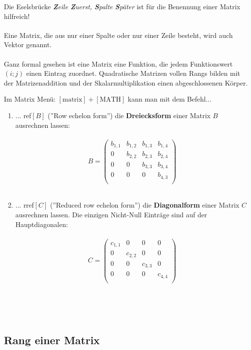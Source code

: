 \documentclass[main.tex]{subfiles}
\begin{document}
\begin{Bemerkung}
Die Eselsbrücke \textit{\textbf{Z}eile \textbf{Z}uerst, \textbf{S}palte \textbf{S}päter} ist für die Benennung einer Matrix hilfreich!\\\\
Eine Matrix, die aus nur einer Spalte oder nur einer Zeile besteht, wird auch Vektor genannt.\\\\
Ganz formal gesehen ist eine Matrix eine Funktion, die jedem Funktionswert $(i;j)$ einen Eintrag zuordnet. Quadratische Matrizen vollen Rangs bilden mit der Matrizenaddition und der Skalarmultiplikation einen abgeschlossenen Körper.
\end{Bemerkung}


\begin{GTR-Tipp}
Im Matrix Menü: $[\text{matrix}] + [\text{MATH}]$ kann man mit dem Befehl...\\
\begin{enumerate}
\item ... ref$[B]$ (''Row echelon form'') die \textbf{Dreiecksform} einer Matrix $B$ ausrechnen lassen:\\\\
$$B= \begin{pmatrix}
b_{1,1}&b_{1,2}&b_{1,3}&b_{1,4}\\
0&b_{2,2}&b_{2,3}&b_{2,4}\\
0&0&b_{3,3}&b_{3,4}\\
0&0&0&b_{4,3}\\
\end{pmatrix}$$\\
\item ... rref$[C]$ (''Reduced row echelon form'') die \textbf{Diagonalform} einer Matrix $C$ ausrechnen lassen. Die einzigen Nicht-Null Einträge sind auf der Hauptdiagonalen:\\\\
$$C= \begin{pmatrix}
c_{1,1}&0&0&0\\
0&c_{2,2}&0&0\\
0&0&c_{3,3}&0\\
0&0&0&c_{4,4}\\
\end{pmatrix}$$\\
\end{enumerate}
\end{GTR-Tipp}\\
\\

\subsection{Rang einer Matrix}
\end{document}
